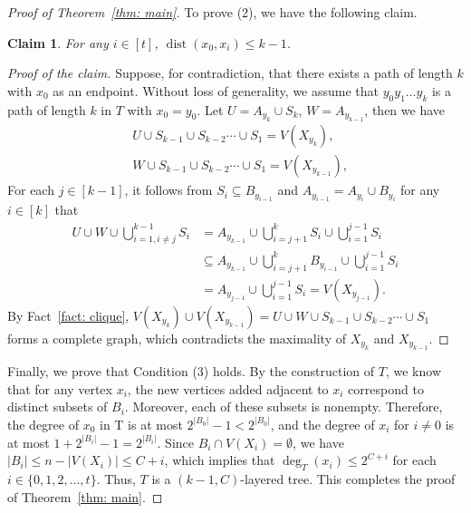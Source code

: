 \documentclass[11pt,a4paper]{article}
\newtheorem{claim}[definition]{Claim}
\newenvironment{poc}{\begin{proof}[Proof of the claim]\renewcommand*{\qedsymbol}{$\blacksquare$}}{\end{proof}}
\newcommand{\dist}{\operatorname{dist}}
\begin{document}
\begin{proof}[Proof of Theorem~\ref{thm: main}]
To prove (2), we have the following claim.
\begin{claim}
    For any $i\in [t]$, $\dist(x_0,x_i) \le k-1$.
\end{claim}
\begin{poc}
    Suppose, for contradiction, that there exists a path of length $k$ with $x_0$ as an endpoint. 
    Without loss of generality, we assume that $y_0y_1\dots y_k$ is a path of length $k$ in $T$ with $x_0=y_0$.     
Let $U = A_{y_k} \cup S_k$, $W=A_{y_{k-1}}$, then we have
\begin{align*}
    &U\cup S_{k-1} \cup S_{k-2} \cdots \cup S_1 = V(X_{y_k}), \\
    &W \cup S_{k-1} \cup S_{k-2} \cdots \cup S_1 = V(X_{y_{k-1}}), 
\end{align*}
For each $j\in [k-1]$, it follows from $S_i \subseteq B_{y_{i-1}}$ and $A_{y_{i-1}} = A_{y_{i}} \cup B_{y_{i}}$ for any $i\in[k]$  that
\begin{align*}
    U\cup W \cup \bigcup_{i=1, i\ne j}^{k-1}S_i &= A_{y_{k-1}}\cup \bigcup^{k}_{i=j+1} S_{i}\cup \bigcup^{j-1}_{i=1} S_i \\
    &\subseteq  A_{y_{k-1}}\cup \bigcup^{k}_{i=j+1} B_{y_{i-1}}\cup \bigcup^{j-1}_{i=1} S_i\\
    &= A_{y_{j-1}}\cup \bigcup^{j-1}_{i=1} S_i=V(X_{y_{j-1}}).      
\end{align*}
By Fact~\ref{fact: clique}, $ V(X_{y_k})\cup V(X_{y_{k-1}}) = U\cup W \cup  S_{k-1} \cup S_{k-2} \cdots \cup S_1$ forms a complete graph, which contradicts the maximality of $X_{y_k}$ and $X_{y_{k-1}}$.
\end{poc}
Finally, we prove that Condition (3) holds. By the construction of  $T$, we know that for any vertex $x_i$, the new vertices added adjacent to $x_i$ correspond to distinct subsets of $B_i$. Moreover, each of these subsets is nonempty. Therefore, the degree of $x_0$ in T is at most $2^{|B_0|}-1 <  2^{|B_0|}$, and the degree of $x_i$ for $i\ne 0$ is at most $1+2^{|B_i|}-1 = 2^{|B_i|}$.
Since $B_i \cap V(X_i) = \emptyset$, we have $|B_i| \le n- |V(X_i)| \le C+i$, which implies that $\deg_T(x_i) \le 2^{C+i}$ for each $i\in \{0,1,2,\dots, t\}$.
Thus, $T$ is a $(k-1,C)$-layered tree. This completes the proof of Theorem~\ref{thm: main}.
\end{proof}
\end{document}
